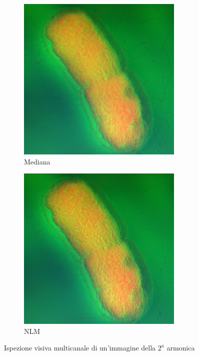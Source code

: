 \documentclass[../main.tex]{subfiles}
\begin{document}
\begin{figure}[h]
\begin{subfigure}{0.32\linewidth}
		\includegraphics[keepaspectratio, width=\linewidth]{images/multi_med.png}
		\caption{Mediana}
	\end{subfigure}
	\begin{subfigure}{0.32\linewidth}
		\centering
		\includegraphics[keepaspectratio, width=\linewidth]{images/multi_nlm.png}
		\caption{NLM}
	\end{subfigure}
	\caption{Ispezione visiva multicanale di un'immagine della $2^a$ armonica}
\end{figure} 
\end{document}

